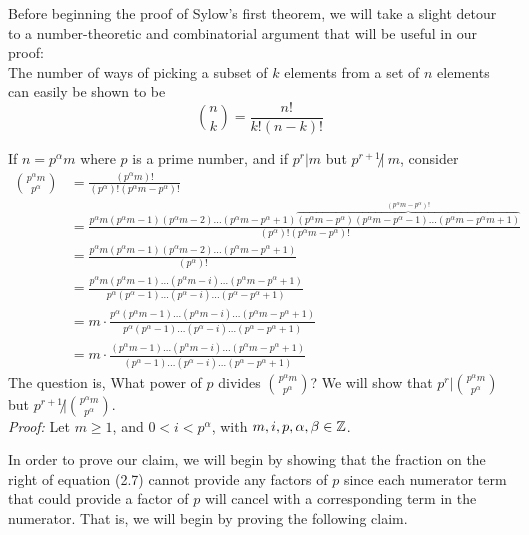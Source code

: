 \noindent Before beginning the proof of Sylow's first theorem, we will take a slight detour to a
number-theoretic and combinatorial argument that will be useful in our proof: \\
The number of ways of picking a subset of $k$ elements from a set of $n$ elements can easily be
shown to be
\begin{equation}
    {n \choose k} = {\frac{n!}{k!(n-k)!}} \nonumber
\end{equation}

If $n=p^\alpha m$ where $p$ is a prime number, and if $p^r|m$ but $p^{r+1}\not | \ m$, consider
\begin{align}
    {p^\alpha m \choose p^\alpha} &= \frac{(p^\alpha m)!}{(p^\alpha)!(p^\alpha m - p^\alpha)!} \nonumber \\
    &= \frac{p^\alpha m (p^\alpha m -1)(p^\alpha m - 2)\dots(p^\alpha m - p^\alpha + 1)\overbrace{(p^\alpha m - p^\alpha)(p^\alpha m -p^\alpha -1)\dots(p^\alpha m - p^\alpha m + 1)}^{(p^\alpha m -p^\alpha)!}}{(p^\alpha)!(p^\alpha m -p^\alpha)!} \nonumber \\
    &= \frac{p^\alpha m (p^\alpha m -1)(p^\alpha m - 2)\dots(p^\alpha m - p^\alpha + 1)}{(p^\alpha)!} \nonumber \\
    &= \frac{p^\alpha m (p^\alpha m -1) \dots (p^\alpha m - i) \dots (p^\alpha m - p^\alpha +1)}{p^\alpha (p^\alpha -1) \dots (p^\alpha - i) \dots (p^\alpha - p^\alpha +1)} \nonumber \\
    &= m\cdot \frac{p^\alpha (p^\alpha m -1) \dots (p^\alpha m - i) \dots (p^\alpha m - p^\alpha +1)}{p^\alpha (p^\alpha -1) \dots (p^\alpha - i) \dots (p^\alpha - p^\alpha +1)} \nonumber \\
    &= m\cdot \frac{ (p^\alpha m -1) \dots (p^\alpha m - i) \dots (p^\alpha m - p^\alpha +1)}{ (p^\alpha -1) \dots (p^\alpha - i) \dots (p^\alpha - p^\alpha +1)}
\end{align}
The question is, What power of $p$ divides ${p^\alpha m \choose p^\alpha}$? We will show that
$p^r | {p^\alpha m \choose p^\alpha}$ but $p^{r+1} \not | {p^\alpha m \choose p^\alpha}$. \\
\textit{Proof:} Let $m\geq 1$, and $0<i<p^\alpha$, with $m,i,p,\alpha,\beta \in {\mathbb{Z}}$.\steezybreak

\noindent In order to prove our claim, we will begin by showing that the fraction on the right of
equation (2.7) cannot provide any factors of $p$ since each numerator term that could provide a
factor of $p$ will cancel with a corresponding term in the numerator. That is, we will begin by
proving the following claim. \steezybreak

